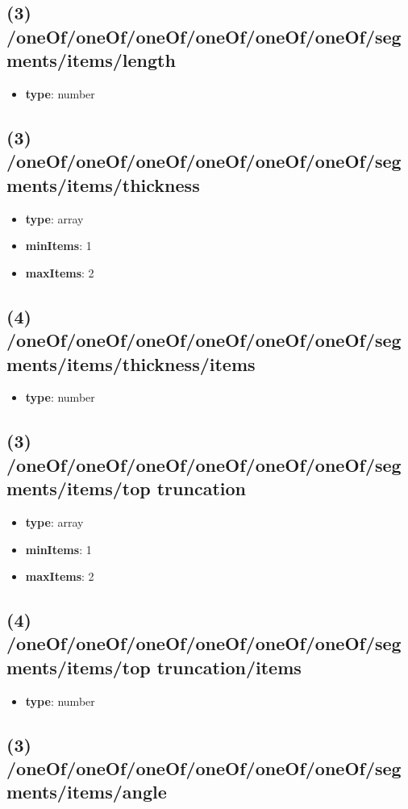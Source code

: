 \subsection{(3) /oneOf/oneOf/oneOf/oneOf/oneOf/oneOf/segments/items/length}
\begin{itemize}[leftmargin=3em]\item {\bf type}: number
\end{itemize}\subsection{(3) /oneOf/oneOf/oneOf/oneOf/oneOf/oneOf/segments/items/thickness}
\begin{itemize}[leftmargin=3em]\item {\bf type}: array
\item {\bf minItems}: 1
\item {\bf maxItems}: 2
\end{itemize}\subsection{(4) /oneOf/oneOf/oneOf/oneOf/oneOf/oneOf/segments/items/thickness/items}
\begin{itemize}[leftmargin=4em]\item {\bf type}: number
\end{itemize}\subsection{(3) /oneOf/oneOf/oneOf/oneOf/oneOf/oneOf/segments/items/top truncation}
\begin{itemize}[leftmargin=3em]\item {\bf type}: array
\item {\bf minItems}: 1
\item {\bf maxItems}: 2
\end{itemize}\subsection{(4) /oneOf/oneOf/oneOf/oneOf/oneOf/oneOf/segments/items/top truncation/items}
\begin{itemize}[leftmargin=4em]\item {\bf type}: number
\end{itemize}\subsection{(3) /oneOf/oneOf/oneOf/oneOf/oneOf/oneOf/segments/items/angle}
